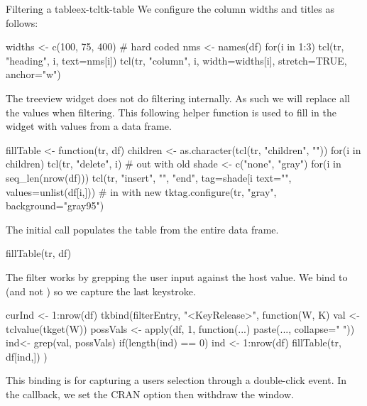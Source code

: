 \begin{example}{Filtering a table}{ex-tcltk-table}
We configure the column widths and titles as follows:
\begin{Schunk}
\begin{Sinput}
 widths <- c(100, 75, 400)            # hard coded
 nms <- names(df)
 for(i in 1:3) {
   tcl(tr, "heading", i, text=nms[i])
   tcl(tr, "column", i, width=widths[i], stretch=TRUE, anchor="w")
 }
\end{Sinput}
\end{Schunk}
%
The treeview widget does not do filtering internally. As such we will
replace all the values when filtering.  This following helper function
is used to fill in the widget with values from a data frame.
\begin{Schunk}
\begin{Sinput}
 fillTable <- function(tr, df) {
   children <- as.character(tcl(tr, "children", ""))
   for(i in children) tcl(tr, "delete", i) # out with old
   shade <- c("none", "gray")
   for(i in seq_len(nrow(df))) 
     tcl(tr, "insert", "", "end", tag=shade[i %
         text="",  
         values=unlist(df[i,]))          # in with new
   tktag.configure(tr, "gray", background="gray95")
 }
\end{Sinput}
\end{Schunk}
The initial call populates the table from the entire data frame.
\begin{Schunk}
\begin{Sinput}
 fillTable(tr, df)
\end{Sinput}
\end{Schunk}

The filter works by grepping the user input against the host value. We
bind to  (and not ) so we capture the last keystroke.
\begin{Schunk}
\begin{Sinput}
 curInd <- 1:nrow(df)
 tkbind(filterEntry, "<KeyRelease>", function(W, K) {
   val <- tclvalue(tkget(W))
   possVals <- apply(df, 1, function(...) 
                     paste(..., collapse=" "))
   ind<- grep(val, possVals)
   if(length(ind) == 0) ind <- 1:nrow(df)
   fillTable(tr, df[ind,])
 })
\end{Sinput}
\end{Schunk}
%
This binding is for capturing a users selection through a double-click
event. In the callback, we set the CRAN option then withdraw the window.
\begin{Schunk}
\end{Schunk}
\end{example}



